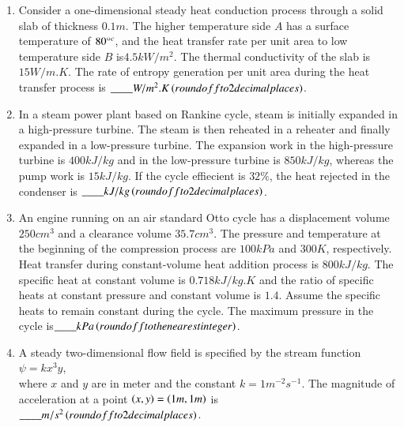 \documentclass[journal]{IEEEtran}
\begin{document}
\begin{enumerate}
     \item Consider a one-dimensional steady heat conduction process through a solid slab of 
     thickness $0.1 m$. The higher temperature side $A$ has a surface temperature of $80\degree^{c}$, and the heat transfer rate per unit area to low temperature side $B$ is$ 4.5 kW/m^{2}$. The thermal conductivity of the slab is $15 W/m.K$. The rate of entropy generation per unit area during the heat transfer process is $\_\_\_\_ W/m^{2}.K \left(round off to 2 decimal places\right)$.\\
     \item In a steam power plant based on Rankine cycle, steam is initially expanded in a 
     high-pressure turbine. The steam is then reheated in a reheater and finally expanded in a low-pressure turbine. The expansion work in the high-pressure turbine is $400 kJ/kg$ and in the low-pressure turbine is $850 kJ/kg$, whereas the pump work is $15 kJ/kg$. If the cycle effiecient is $32\%$, the heat rejected in the condenser is $\_\_\_\_kJ/kg \left(round off to 2 decimal places\right)$.\\
     \item An engine running on an air standard Otto cycle has a displacement volume $250 cm^{3}$
     and a clearance volume $35.7 cm^{3}$. The pressure and temperature at the beginning of the compression process are $100 kPa$ and $300 K$, respectively. Heat transfer during constant-volume heat addition process is $800 kJ/kg$. The specific heat at constant volume is $0.718 kJ/kg.K$ and the ratio of specific heats at constant pressure and constant volume is $1.4$. Assume the specific heats to remain constant during the cycle. The maximum pressure in the cycle is$\_\_\_\_ kPa \left(round off to the nearest integer\right)$.\\
     \item A steady two-dimensional flow field is specified by the stream function\\
                      $\psi=kx^{3}y$,\\
     where $x$ and $y$ are in meter and the constant $k=1 m^{-2}s^{-1}$. The magnitude of acceleration at a point $\left(x,y\right)=\left(1 m,1 m\right)$ is $\_\_\_\_m/s^{2} \left(round off to 2 decimal places\right)$.\\

\end{enumerate}
\end{document}
